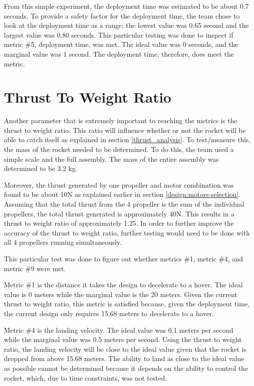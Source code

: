 From this simple experiment, the deployment time was estimated to be about 0.7 seconds. To provide a safety factor for the deployment time, the team chose to look at the deployment time as a range; the lowest value was 0.65 second and the largest value was 0.80 seconds. This particular testing was done to inspect if metric \#5, deployment time, was met. The ideal value was 0 seconds, and the marginal value was 1 second. The deployment time, therefore, does meet the metric. 

\section{Thrust To Weight Ratio}
Another parameter that is extremely important to reaching the metrics is the thrust to weight ratio. This ratio will influence whether or not the rocket will be able to catch itself as explained in section \ref{thrust_analysis}. 
To test/measure this, the mass of the rocket needed to be determined. To do this, the team used a simple scale and the full assembly. The mass of the entire assembly was determined to be 3.2 kg. 

Moreover, the thrust generated by one propeller and motor combination was found to be about 10N as explained earlier in section \ref{design:motors-selection}. Assuming that the total thrust from the 4 propeller is the sum of the individual propellers, the total thrust generated is approximately 40N. This results in a thrust to weight ratio of approximately 1.25. 
In order to further improve the accuracy of the thrust to weight ratio, further testing would need to be done with all 4 propellers running simultaneously.

This particular test was done to figure out whether metrics \#1, metric \#4, and metric \#9 were met.

Metric \#1 is the distance it takes the design to decelerate to a hover. The ideal value is 0 meters while the marginal value is the 20 meters. Given the current thrust to weight ratio, this metric is satisfied because, given the deployment time, the current design only requires 15.68 meters to decelerate to a hover.

Metric \#4 is the landing velocity. The ideal value was 0.1 meters per second while the marginal value was 0.5 meters per second. Using the thrust to weight ratio, the landing velocity will be close to the ideal value given that the rocket is dropped from above 15.68 meters. The ability to land as close to the ideal value as possible cannot be determined because it depends on the ability to control the rocket, which, due to time constraints, was not tested.

